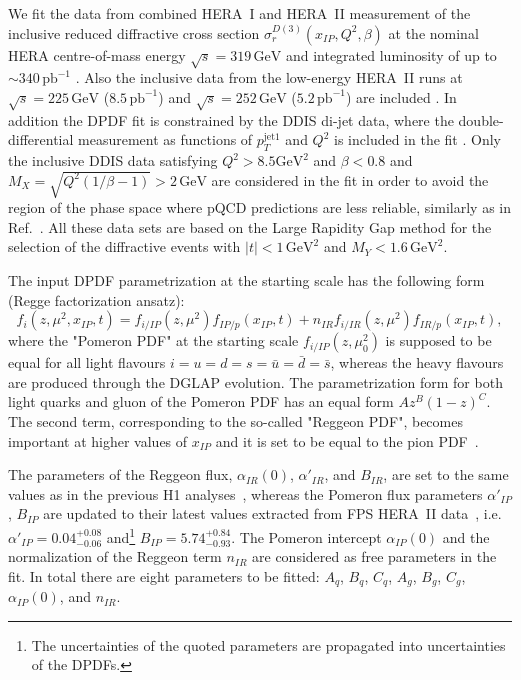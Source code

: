 \documentclass{PoS}
\newcommand{\IP}{I\!\!P}
\newcommand{\IR}{I\!\!R}
\newcommand{\xpom}{x_{\IP}}
\newcommand{\GeV}{\ensuremath{\mathrm{GeV}}\xspace}
\newcommand{\GeVsq}{\ensuremath{\mathrm{GeV}^2}\xspace}
\begin{document}
We fit the data from combined HERA~I and HERA~II measurement of the inclusive reduced diffractive cross section $\sigma_r^{D(3)}(\xpom, Q^2, \beta)$  at the nominal HERA centre-of-mass energy $\sqrt{s} = 319\,\GeV$ and integrated luminosity of up to $\sim\!\! 340\,\text{pb}^{-1}$  \cite{Aaron:2012ad}.
Also the inclusive data from the low-energy HERA~II runs at $\sqrt{s} = 225\,\GeV$ ($8.5\,\text{pb}^{-1}$) and $\sqrt{s} = 252\,\GeV$ ($5.2\,\text{pb}^{-1}$) are included \cite{Aaron:2012zz}.
In addition the DPDF fit is constrained by the DDIS di-jet data, where the double-differential measurement as functions of $p_T^{\mathrm{jet}1}$ and $Q^2$ is included in the fit \cite{Andreev:2014yra}.
Only the inclusive DDIS data satisfying $Q^2 > 8.5 \GeVsq$ and $\beta < 0.8$ and $M_X = \sqrt{Q^2(1/\beta - 1)} > 2\,\GeV$ are considered in the fit in order to avoid the region of the phase space where pQCD predictions are less reliable, similarly as in Ref.~\cite{Aktas:2006hy}.
All these data sets are based on the Large Rapidity Gap method for the selection of the diffractive events with $|t| < 1\,\GeVsq$ and $M_Y < 1.6\,\GeVsq$.


The input DPDF parametrization at the starting scale has the following form (Regge factorization ansatz):
\begin{equation}
f_i (z, \mu^2, \xpom, t) = f_{i/\IP} (z, \mu^2) f_{\IP/p} (\xpom, t) + n_{\IR} f_{i/\IR} (z, \mu^2) f_{\IR/p} (\xpom, t),
\end{equation}
where the "Pomeron PDF" at the starting scale  $f_{i/\IP}(z, \mu_0^2)$ is supposed to be equal for all light flavours $i=u=d=s = \bar{u} = \bar{d} = \bar{s}$, whereas the heavy flavours are produced through the DGLAP evolution.
The parametrization form for both light quarks and gluon of the Pomeron PDF has an equal form $A z^B (1-z)^C$.
The second term, corresponding to the so-called "Reggeon PDF", becomes important at higher values of $\xpom$ and it is set to be equal to the pion PDF~\cite{Owens:1984zj}.

The parameters of the Reggeon flux, $\alpha_{\IR}(0)$,  $\alpha'_{\IR}$, and $B_{\IR}$,  are set to the same values as in the previous H1 analyses~\cite{Aktas:2006hy,Aktas:2007bv}, whereas the Pomeron flux parameters $\alpha'_{\IP}$, $B_{\IP}$ are updated to their latest values extracted from FPS HERA~II data~\cite{Aaron:2010aa}, i.e. $\alpha'_{\IP} = 0.04^{+0.08}_{-0.06}$ and\footnote{The uncertainties of the quoted parameters are propagated into uncertainties of the DPDFs.} $B_{\IP} = 5.74^{+0.84}_{-0.93}$.
The Pomeron intercept $\alpha_{\IP}(0)$ and the normalization of the Reggeon term $n_{\IR}$ are considered as free parameters in the fit.
In total there are eight parameters to be fitted: $A_q$, $B_q$, $C_q$, $A_g$, $B_g$, $C_g$, $\alpha_{\IP}(0)$, and $n_{\IR}$.
\end{document}
